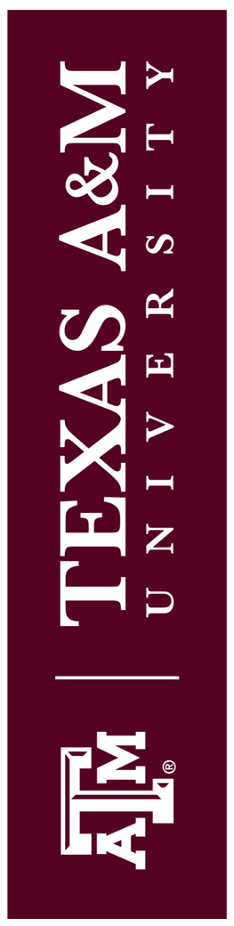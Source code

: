 \documentclass[final]{beamer}
\theoremstyle{thrm}
\begin{document}
\begin{frame}
\begin{minipage}{1\textwidth}
\begin{minipage}{.25\textwidth}
\begin{center}
\begin{figure}
  \includegraphics[angle=270,scale=.3]{figures/tamulogo.png}
\end{figure}
\end{center}
\end{minipage}
\end{minipage}



\end{frame}
\end{document}
